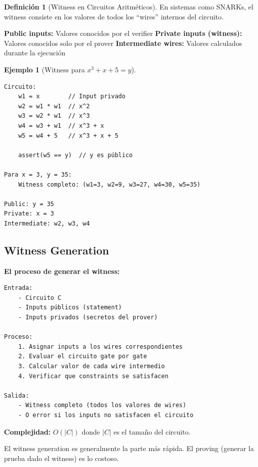 \documentclass[11pt,a4paper,twoside,openright]{book}
\theoremstyle{definition}
\newtheorem{definition}{Definición}[chapter]
\newtheorem{example}{Ejemplo}[chapter]
\theoremstyle{plain}
\theoremstyle{remark}
\begin{document}
\begin{definition}[Witness en Circuitos Aritméticos]
En sistemas como SNARKs, el witness consiste en los valores de todos los ``wires'' internos del circuito.

\textbf{Public inputs:} Valores conocidos por el verifier
\textbf{Private inputs (witness):} Valores conocidos solo por el prover
\textbf{Intermediate wires:} Valores calculados durante la ejecución
\end{definition}

\begin{example}[Witness para $x^3 + x + 5 = y$]
\begin{verbatim}
Circuito:
    w1 = x        // Input privado
    w2 = w1 * w1  // x^2
    w3 = w2 * w1  // x^3
    w4 = w3 + w1  // x^3 + x
    w5 = w4 + 5   // x^3 + x + 5
    
    assert(w5 == y)  // y es público
    
Para x = 3, y = 35:
    Witness completo: (w1=3, w2=9, w3=27, w4=30, w5=35)
    
Public: y = 35
Private: x = 3
Intermediate: w2, w3, w4
\end{verbatim}
\end{example}

\subsection{Witness Generation}

\begin{keyidea}
\textbf{El proceso de generar el witness:}

\begin{verbatim}
Entrada: 
    - Circuito C
    - Inputs públicos (statement)
    - Inputs privados (secretos del prover)

Proceso:
    1. Asignar inputs a los wires correspondientes
    2. Evaluar el circuito gate por gate
    3. Calcular valor de cada wire intermedio
    4. Verificar que constraints se satisfacen
    
Salida:
    - Witness completo (todos los valores de wires)
    - O error si los inputs no satisfacen el circuito
\end{verbatim}

\textbf{Complejidad:} $O(|C|)$ donde $|C|$ es el tamaño del circuito.

El witness generation es generalmente la parte más rápida. El proving (generar la prueba dado el witness) es lo costoso.
\end{keyidea}
\end{document}
